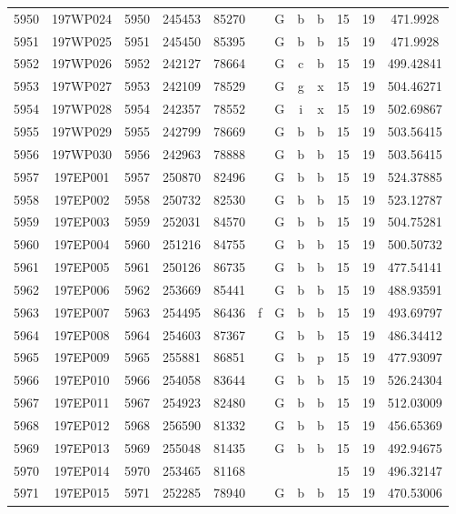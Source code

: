 \begin{tabular}{|*{12}{c|}}
5950 & 197WP024 & 5950 & 245453 & 85270 &  & G & b & b & 15 & 19 & 471.9928 \\ 
5951 & 197WP025 & 5951 & 245450 & 85395 &  & G & b & b & 15 & 19 & 471.9928 \\ 
5952 & 197WP026 & 5952 & 242127 & 78664 &  & G & c & b & 15 & 19 & 499.42841 \\ 
5953 & 197WP027 & 5953 & 242109 & 78529 &  & G & g & x & 15 & 19 & 504.46271 \\ 
5954 & 197WP028 & 5954 & 242357 & 78552 &  & G & i & x & 15 & 19 & 502.69867 \\ 
5955 & 197WP029 & 5955 & 242799 & 78669 &  & G & b & b & 15 & 19 & 503.56415 \\ 
5956 & 197WP030 & 5956 & 242963 & 78888 &  & G & b & b & 15 & 19 & 503.56415 \\ 
5957 & 197EP001 & 5957 & 250870 & 82496 &  & G & b & b & 15 & 19 & 524.37885 \\ 
5958 & 197EP002 & 5958 & 250732 & 82530 &  & G & b & b & 15 & 19 & 523.12787 \\ 
5959 & 197EP003 & 5959 & 252031 & 84570 &  & G & b & b & 15 & 19 & 504.75281 \\ 
5960 & 197EP004 & 5960 & 251216 & 84755 &  & G & b & b & 15 & 19 & 500.50732 \\ 
5961 & 197EP005 & 5961 & 250126 & 86735 &  & G & b & b & 15 & 19 & 477.54141 \\ 
5962 & 197EP006 & 5962 & 253669 & 85441 &  & G & b & b & 15 & 19 & 488.93591 \\ 
5963 & 197EP007 & 5963 & 254495 & 86436 & f & G & b & b & 15 & 19 & 493.69797 \\ 
5964 & 197EP008 & 5964 & 254603 & 87367 &  & G & b & b & 15 & 19 & 486.34412 \\ 
5965 & 197EP009 & 5965 & 255881 & 86851 &  & G & b & p & 15 & 19 & 477.93097 \\ 
5966 & 197EP010 & 5966 & 254058 & 83644 &  & G & b & b & 15 & 19 & 526.24304 \\ 
5967 & 197EP011 & 5967 & 254923 & 82480 &  & G & b & b & 15 & 19 & 512.03009 \\ 
5968 & 197EP012 & 5968 & 256590 & 81332 &  & G & b & b & 15 & 19 & 456.65369 \\ 
5969 & 197EP013 & 5969 & 255048 & 81435 &  & G & b & b & 15 & 19 & 492.94675 \\ 
5970 & 197EP014 & 5970 & 253465 & 81168 &  &  &  &  & 15 & 19 & 496.32147 \\ 
5971 & 197EP015 & 5971 & 252285 & 78940 &  & G & b & b & 15 & 19 & 470.53006 \\ 

\end{tabular}
